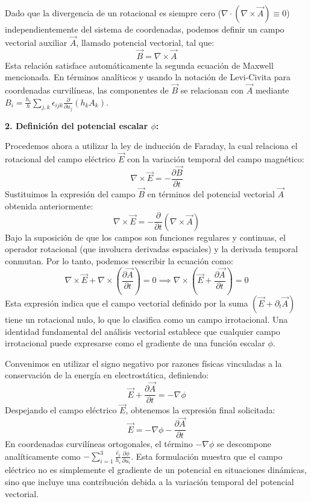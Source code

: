 \documentclass[a4paper]{article}
\begin{document}
Dado que la divergencia de un rotacional es siempre cero ($\nabla \cdot (\nabla \times \vec{A}) \equiv 0$) independientemente del sistema de coordenadas, podemos definir un campo vectorial auxiliar $\vec{A}$, llamado potencial vectorial, tal que:
\begin{equation}
\vec{B} = \nabla \times \vec{A}
\end{equation}
Esta relación satisface automáticamente la segunda ecuación de Maxwell mencionada. En términos analíticos y usando la notación de Levi-Civita para coordenadas curvilíneas, las componentes de $\vec{B}$ se relacionan con $\vec{A}$ mediante $B_i = \frac{h_i}{h} \sum_{j,k} \epsilon_{ijk} \frac{\partial}{\partial u_j} (h_k A_k)$.

\textbf{2. Definición del potencial escalar $\phi$:}

Procedemos ahora a utilizar la ley de inducción de Faraday, la cual relaciona el rotacional del campo eléctrico $\vec{E}$ con la variación temporal del campo magnético:
\begin{equation}
\nabla \times \vec{E} = -\frac{\partial \vec{B}}{\partial t}
\end{equation}
Sustituimos la expresión del campo $\vec{B}$ en términos del potencial vectorial $\vec{A}$ obtenida anteriormente:
\begin{equation}
\nabla \times \vec{E} = -\frac{\partial}{\partial t} (\nabla \times \vec{A})
\end{equation}
Bajo la suposición de que los campos son funciones regulares y continuas, el operador rotacional (que involucra derivadas espaciales) y la derivada temporal conmutan. Por lo tanto, podemos reescribir la ecuación como:
\begin{equation}
\nabla \times \vec{E} + \nabla \times \left( \frac{\partial \vec{A}}{\partial t} \right) = 0 \implies \nabla \times \left( \vec{E} + \frac{\partial \vec{A}}{\partial t} \right) = 0
\end{equation}
Esta expresión indica que el campo vectorial definido por la suma $(\vec{E} + \partial_t \vec{A})$ tiene un rotacional nulo, lo que lo clasifica como un campo irrotacional. Una identidad fundamental del análisis vectorial establece que cualquier campo irrotacional puede expresarse como el gradiente de una función escalar $\phi$. 

Convenimos en utilizar el signo negativo por razones físicas vinculadas a la conservación de la energía en electrostática, definiendo:
\begin{equation}
\vec{E} + \frac{\partial \vec{A}}{\partial t} = -\nabla \phi
\end{equation}
Despejando el campo eléctrico $\vec{E}$, obtenemos la expresión final solicitada:
\begin{equation}
\vec{E} = -\nabla \phi - \frac{\partial \vec{A}}{\partial t}
\end{equation}
En coordenadas curvilíneas ortogonales, el término $-\nabla \phi$ se descompone analíticamente como $-\sum_{i=1}^3 \frac{\hat{e}_i}{h_i} \frac{\partial \phi}{\partial u_i}$. Esta formulación muestra que el campo eléctrico no es simplemente el gradiente de un potencial en situaciones dinámicas, sino que incluye una contribución debida a la variación temporal del potencial vectorial.
\end{document}
